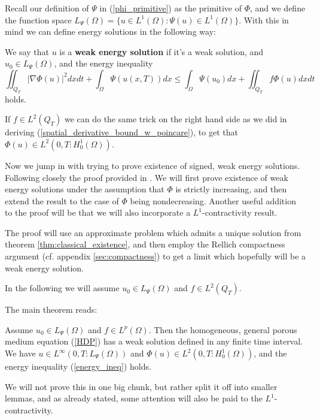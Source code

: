 \documentclass[11pt, a4paper]{article}
\begin{document}
Recall our definition of $\Psi$ in (\ref{phi_primitive}) as the primitive of $\Phi$,
and we define the function space $L_\Psi(\Omega) = \{ u\in L^1(\Omega): \Psi(u)\in L^1(\Omega)\}$.
With this in mind we can define energy solutions in the following way:
\begin{mydef}
We say that $u$ is a \textbf{weak energy solution} if it's a weak solution, and $u_0 \in L_\Psi(\Omega)$, and the energy inequality
\begin{equation}
\label{energy_ineq}
\iint_{Q_T} |\nabla \Phi(u)|^2 dxdt + \int_\Omega \Psi(u(x,T))dx \leq \int_\Omega \Psi(u_0)dx + \iint_{Q_T}f\Phi(u)dxdt
\end{equation}
holds.
\end{mydef}
\setcounter{obs}{0}
\begin{obs}
If $f\in L^2(Q_T)$ we can do the same trick on the right hand side as we did in deriving (\ref{spatial_derivative_bound_w_poincare}), to get that $\Phi(u) \in L^2(0,T: H^1_0(\Omega))$.
\end{obs}

Now we jump in with trying to prove existence of signed, weak energy solutions. Following closely the proof provided in \citep{vazquez2007porous}. We will first prove existence of weak energy solutions under the assumption that $\Phi$ is strictly increasing, and then extend the result to the case of $\Phi$ being nondecreasing. Another useful addition to the proof will be that we will also incorporate a $L^1$-contractivity result.

The proof will use an approximate problem which admits a unique solution from theorem \ref{thm:classical_existence}, and then employ the Rellich compactness argument (cf. appendix \ref{sec:compactness}) to get a limit which hopefully will be a weak energy solution.

In the following we will assume $u_0 \in L_\Psi(\Omega)$ and $f\in L^2(Q_T)$.

The main theorem reads:
\begin{theorem}
\label{thm:weak_existence}
Assume $u_0 \in L_\Psi(\Omega)$ and $f \in L^p (\Omega)$. Then the homogeneous, general porous medium equation (\ref{HDP}) has a weak solution defined in any finite time interval. We have $u \in L^\infty(0,T:L_\Psi(\Omega))$ and $\Phi(u) \in L^2(0,T:H_0^1(\Omega))$, and the energy inequality (\ref{energy_ineq}) holds.
\end{theorem}

We will not prove this in one big chunk, but rather split it off into smaller lemmas, and as already stated, some attention will also be paid to the $L^1$-contractivity.
\end{document}
